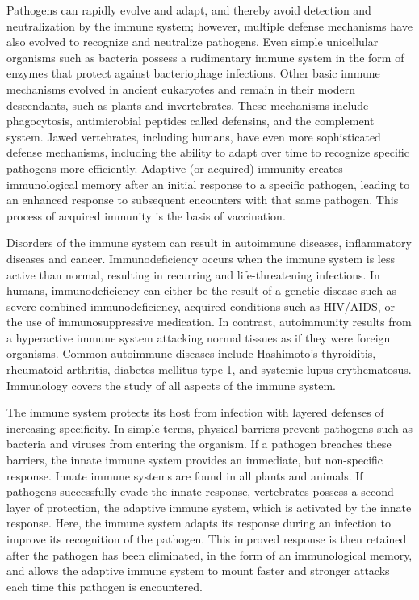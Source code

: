Pathogens can rapidly evolve and adapt, and thereby avoid detection and neutralization by the immune system; however, multiple defense mechanisms have also evolved to recognize and neutralize pathogens. Even simple unicellular organisms such as bacteria possess a rudimentary immune system in the form of enzymes that protect against bacteriophage infections. Other basic immune mechanisms evolved in ancient eukaryotes and remain in their modern descendants, such as plants and invertebrates. These mechanisms include phagocytosis, antimicrobial peptides called defensins, and the complement system. Jawed vertebrates, including humans, have even more sophisticated defense mechanisms, including the ability to adapt over time to recognize specific pathogens more efficiently. Adaptive (or acquired) immunity creates immunological memory after an initial response to a specific pathogen, leading to an enhanced response to subsequent encounters with that same pathogen. This process of acquired immunity is the basis of vaccination.

Disorders of the immune system can result in autoimmune diseases, inflammatory diseases and cancer. Immunodeficiency occurs when the immune system is less active than normal, resulting in recurring and life-threatening infections. In humans, immunodeficiency can either be the result of a genetic disease such as severe combined immunodeficiency, acquired conditions such as HIV/AIDS, or the use of immunosuppressive medication. In contrast, autoimmunity results from a hyperactive immune system attacking normal tissues as if they were foreign organisms. Common autoimmune diseases include Hashimoto's thyroiditis, rheumatoid arthritis, diabetes mellitus type 1, and systemic lupus erythematosus. Immunology covers the study of all aspects of the immune system.

The immune system protects its host from infection with layered defenses of increasing specificity. In simple terms, physical barriers prevent pathogens such as bacteria and viruses from entering the organism. If a pathogen breaches these barriers, the innate immune system provides an immediate, but non-specific response. Innate immune systems are found in all plants and animals. If pathogens successfully evade the innate response, vertebrates possess a second layer of protection, the adaptive immune system, which is activated by the innate response. Here, the immune system adapts its response during an infection to improve its recognition of the pathogen. This improved response is then retained after the pathogen has been eliminated, in the form of an immunological memory, and allows the adaptive immune system to mount faster and stronger attacks each time this pathogen is encountered.

